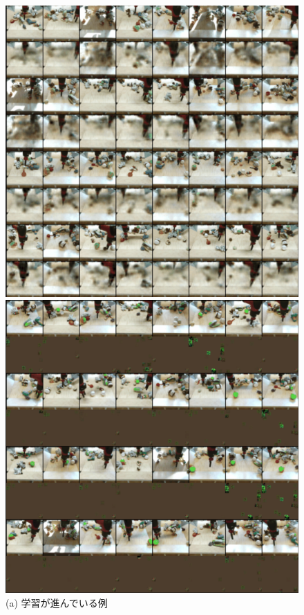 \documentclass[10pt, twocolumn]{jarticle}
\begin{document}
\begin{figure}[tp]
  \begin{minipage}{0.48\hsize}
    \begin{center}
      \includegraphics[width=\linewidth]{./figures/dssm_64.png}
      \caption{(a) 学習が進んでいる例}
    \end{center}
  \end{minipage}
  \begin{minipage}{0.48\hsize}
    \begin{center}
      \includegraphics[width=\linewidth]{./figures/dssm_1024.png}

\end{center}
\end{minipage}
\end{figure}
\end{document}

